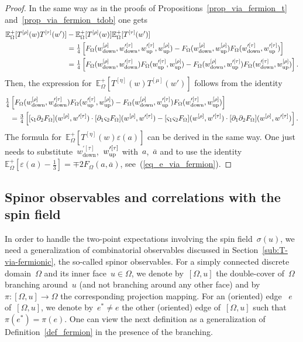 \documentclass[reqno,11pt,a4paper]{amsart}
\theoremstyle{remark}
\newcommand{\CmT}{c_T}
\newcommand{\Teta}{T^{[\eta]}}
\newcommand{\Trho}{T^{[\rho]}}
\newcommand{\Tmu}{T^{[\mu]}}
\newcommand{\Ttau}{T^{[\tau]}}
\newcommand{\E}{\mathbb{E}_\Omega}
\newcommand{\OmegaU}{{[\Omega,u]}}
\newcommand{\weta}{w^{\left[\eta \right]}}
\newcommand{\wrho}{w^{\left[\rho \right]}}
\newcommand{\wup}{\weta_{\vphantom{\mathrm{d}}\mathrm{up}}}
\renewcommand{\wup}{\wrho_{\vphantom{\mathrm{d}}\mathrm{up}}}
\newcommand{\wdown}{\weta_{\mathrm{down}}}
\renewcommand{\wdown}{\wrho_{\mathrm{down}}}
\newcommand{\wpmu}{w^{\prime[\mu]}}
\newcommand{\wpdown}{\wpmu_{\mathrm{down}}}
\newcommand{\wpup}{\wpmu_{\mathrm{up}}}
\newcommand{\wptau}{w^{\prime[\tau]}}                   %
\renewcommand{\wpdown}{\wptau_{\mathrm{down}}}            %
\renewcommand{\wpup}{\wptau_{\mathrm{\vphantom{d}up}}}    %
\newcommand{\F}{F_\Omega}       \newcommand{\Fdelta}{F_{\Omega_\delta}}
\newcommand{\dOne}{\partial_1}
\newcommand{\dTwo}{\partial_2}
\newcommand{\sOne}{\varsigma_1}
\newcommand{\sTwo}{\varsigma_2}
\begin{document}
\begin{proof}
In the same way as in the proofs of Propositions~\ref{prop_via_fermion_t} and~\ref{prop_via_fermion_tdob} one gets
\begin{align*}
\E^+[\Trho(w)\Ttau(w')] &- \E^+[\Trho(w)]\E^+[\Ttau(w')] \\
&= \tfrac{1}{4}\left[\F(\wdown,\wpdown,\wpup,\wup) - \F(\wdown,\wup)\F(\wpdown,\wpup) \right]\\
&= \tfrac{1}{4}\left[\F(\wdown,\wpdown)\F(\wpup,\wup) - \F(\wdown,\wpup)\F(\wpdown,\wup) \right].
\end{align*}
Then, the expression for~$\E^+[\Teta(w)\Tmu(w')]$ follows from the identity
\begin{align*}
\tfrac{1}{4}&\left[\F(\wdown,\wpdown)\F(\wpup,\wup)  - \F(\wdown,\wpup)\F(\wpdown,\wup) \right]\\
&=\tfrac{3}{4}\left[ [\sOne\dTwo\F](\wrho,\wptau)\cdot[\dOne\sTwo \F](\wrho,\wptau)- [\sOne\sTwo\F](\wrho,\wptau)\cdot[\dOne\dTwo\F](\wrho,\wptau) \right].
\end{align*}
The formula for~$\E^+ [\Teta(w)\varepsilon(a)]$ can be derived in the same way.
One just needs to substitute~$\wpdown$,~$\wpup$ with~$a$,~$\overline{a}$
and to use the identity~$\E^+[\varepsilon(a)-\tfrac{1}{3}] = \mp2\F(a,\overline{a})$, see~(\ref{eq_e_via_fermion}).
\end{proof}

\subsection{Spinor observables and correlations with the spin field} \label{sub:T-spin-via-spinors}

In order to handle the two-point expectations involving the spin field~$\sigma(u)$, we need a generalization of combinatorial observables discussed in Section~\ref{sub:T-via-fermionic}, the so-called spinor observables.
For a simply connected discrete domain~$\Omega$ and its inner face~$u\in\Omega$, we denote by~$\OmegaU$ the double-cover of~$\Omega$ branching around~$u$ (and not branching around any other face) and by~$\pi:\OmegaU\to\Omega$ the corresponding projection mapping. For an (oriented) edge ~$e$ of~$\OmegaU$, we denote by~$e^*\ne e$ the other (oriented) edge of~$\OmegaU$ such that~$\pi(e^*)=\pi(e)$.
One can view the next definition as a generalization of Definition~\ref{def_fermion} in the presence of the branching.
\end{document}
